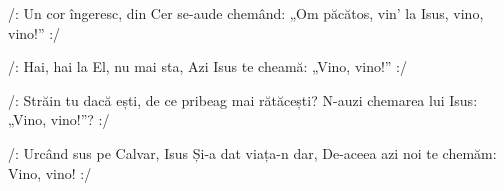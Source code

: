 \beginverse
/: Un cor îngeresc, din Cer se-aude chemând:
„Om păcătos, vin’ la Isus, vino, vino!” :/
\endverse

\beginchorus
/: Hai, hai la El, nu mai sta,
Azi Isus te cheamă: „Vino, vino!” :/
\endchorus

\beginverse
/: Străin tu dacă ești, de ce pribeag mai rătăcești?
N-auzi chemarea lui Isus: „Vino, vino!”? :/
\endverse

\beginverse
/: Urcând sus pe Calvar, Isus Și-a dat viața-n dar,
De-aceea azi noi te chemăm: Vino, vino! :/
\endverse
\endsong